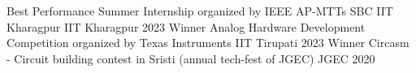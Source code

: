 
\begin{cvhonors}

  \cvhonor
    {Best Performance} %
    {Summer Internship organized by IEEE AP-MTTs SBC IIT Kharagpur} %
    {IIT Kharagpur} %
    {2023} %
  \cvhonor
    {Winner} %
    {Analog Hardware Development Competition organized by Texas Instruments} %
    {IIT Tirupati} %
    {2023} %
  \cvhonor
    {Winner} %
    {Circasm - Circuit building contest in Sristi (annual tech-fest of JGEC)} %
    {JGEC} %
    {2020} %
\end{cvhonors}